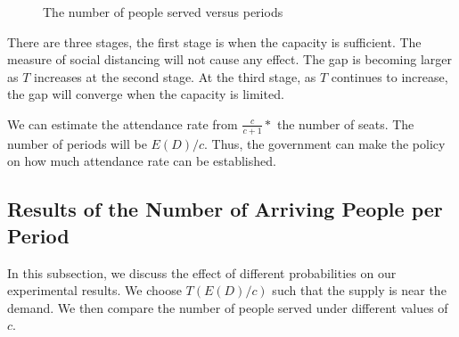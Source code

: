 \begin{figure}[h]
  \centering
  \caption{The number of people served versus periods}
  \label{Fig.lable}
\end{figure}


There are three stages, the first stage is when the capacity is sufficient. The measure of social distancing will not cause any effect. The gap is becoming larger as $T$ increases at the second stage. At the third stage, as $T$ continues to increase, the gap will converge when the capacity is limited.

We can estimate the attendance rate from $\frac{c}{c+1}*$ the number of seats. The number of periods will be $E(D)/c$. Thus, the government can make the policy on how much attendance rate can be established.


\subsection{Results of the Number of Arriving People per Period}

In this subsection, we discuss the effect of different probabilities on our experimental results. We choose $T(E(D)/c)$ such that the supply is near the demand. We then compare the number of people served under different values of $c$.



